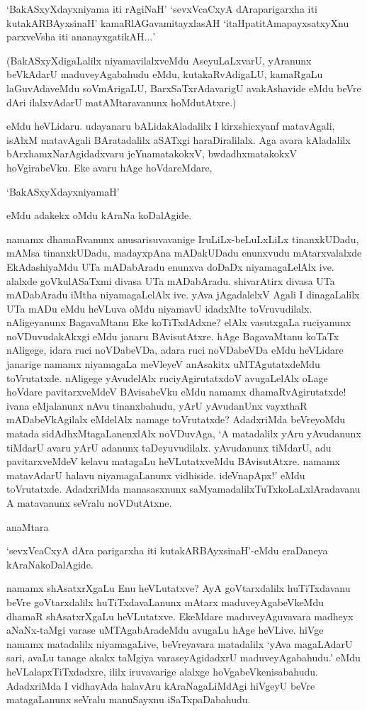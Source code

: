 `BakASxyXdayxniyama iti rAgiNaH' `sevxVcaCxyA dAraparigarxha iti kutakARBAyxsinaH' kamaRlAGavamitayxlasAH `itaHpatitAmapayxsatxyXnu parxveVsha iti ananayxgatikAH$\ldots$'

(BakASxyXdigaLalilx niyamavilalxveMdu AseyuLaLxvarU, yAranunx beVkAdarU maduveyAgabahudu eMdu, kutakaRvAdigaLU, kamaRgaLu laGuvAdaveMdu soVmArigaLU, BarxSaTxrAdavarigU avakAshavide eMdu beVre dAri ilalxvAdarU matAMtaravanunx hoMdutAtxre.)

eMdu heVLidaru. udayanaru bALidakAladalilx I kirxshicxyanf matavAgali, isAlxM matavAgali BAratadalilx aSATxgi haraDiralilalx. Aga avara kAladalilx bArxhamxNarAgidadxvaru jeYnamatakokxV, bwdadhxmatakokxV hoVgirabeVku. Eke avaru hAge hoVdareMdare,

`BakASxyXdayxniyamaH'

eMdu adakekx oMdu kAraNa koDalAgide.

namamx dhamaRvanunx anusarisuvavanige IruLiLx-beLuLxLiLx tinanxkUDadu, mAMsa tinanxkUDadu, madayxpAna mADakUDadu enunxvudu mAtarxvalalxde EkAdashiyaMdu UTa mADabAradu enunxva doDaDx niyamagaLelAlx ive. alalxde goVkulASaTxmi divasa UTa mADabAradu. shivarAtirx divasa UTa mADabAradu iMtha niyamagaLelAlx ive. yAva jAgadalelxV Agali I dinagaLalilx UTa mADu eMdu heVLuva oMdu niyamavU idadxMte toVruvudilalx. nAligeyanunx BagavaMtanu Eke koTiTxdAdxne? elAlx vasutxgaLa ruciyanunx noVDuvudakAkxgi eMdu janaru BAvisutAtxre. hAge BagavaMtanu koTaTx nAligege, idara ruci noVDabeVDa, adara ruci noVDabeVDa eMdu heVLidare janarige namamx niyamagaLa meVleyeV anAsakitx uMTAgutatxdeMdu toVrutatxde. nAligege yAvudelAlx
ruciyAgirutatxdoV avugaLelAlx oLage hoVdare pavitarxveMdeV BAvisabeVku eMdu namamx dhamaRvAgirutatxde! ivana eMjalanunx nAvu tinanxbahudu, yArU yAvudanUnx vayxthaR mADabeVkAgilalx eMdelAlx namage toVrutatxde? AdadxriMda beVreyoMdu matada sidAdhxMtagaLanenxlAlx noVDuvAga, `A matadalilx yAru yAvudanunx tiMdarU avaru yArU adanunx taDeyuvudilalx. yAvudanunx tiMdarU, adu pavitarxveMdeV kelavu matagaLu heVLutatxveMdu BAvisutAtxre. namamx matavAdarU halavu niyamagaLanunx vidhiside. ideVnapApx!' eMdu toVrutatxde. AdadxriMda 
manasasxnunx saMyamadalilxTuTxkoLaLxlAradavanu A matavanunx seVralu noVDutAtxne.

anaMtara 

`sevxVcaCxyA dAra parigarxha iti kutakARBAyxsinaH'-eMdu eraDaneya kAraNakoDalAgide.

namamx shAsatxrXgaLu Enu heVLutatxve? AyA goVtarxdalilx huTiTxdavanu beVre goVtarxdalilx huTiTxdavaLanunx mAtarx maduveyAgabeVkeMdu dhamaR shAsatxrXgaLu heVLutatxve. EkeMdare maduveyAguvavara madheyx aNaNx-taMgi varase uMTAgabAradeMdu avugaLu hAge heVLive. hiVge 
namamx matadalilx niyamagaLive, beVreyavara matadalilx `yAva magaLAdarU sari, avaLu tanage akakx taMgiya varaseyAgidadxrU maduveyAgabahudu.' eMdu heVLalapxTiTxdadxre, ililx iruvavarige alalxge hoVgabeVkenisabahudu. AdadxriMda I vidhavAda halavAru kAraNagaLiMdAgi 
hiVgeyU beVre matagaLanunx seVralu manuSayxnu iSaTxpaDabahudu.

